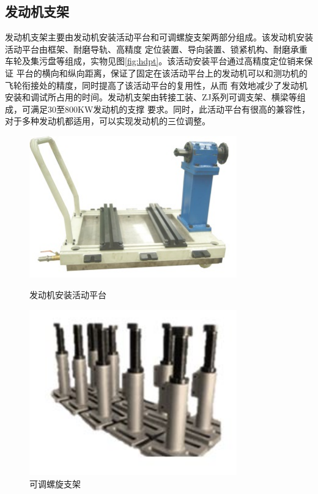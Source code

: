 \subsection{发动机支架}
发动机支架主要由发动机安装活动平台和可调螺旋支架两部分组成。该发动机安装活动平台由框架、耐磨导轨、高精度
定位装置、导向装置、锁紧机构、耐磨承重车轮及集污盘等组成，实物见图\ref{fig:hdpt}。该活动安装平台通过高精度定位销来保证
平台的横向和纵向距离，保证了固定在该活动平台上的发动机可以和测功机的飞轮衔接处的精度，同时提高了该活动平台的复用性，从而
有效地减少了发动机安装和调试所占用的时间。发动机支架由转接工装、ZJ系列可调支架、横梁等组成，可满足30至800KW发动机的支撑
要求。同时，此活动平台有很高的兼容性，对于多种发动机都适用，可以实现发动机的三位调整。
\begin{figure}[!h]
	\begin{minipage}[h]{0.5\linewidth}
		\includegraphics[width=0.8\textwidth]{thesis_figure/platformer_chapter/hdpt}
		\caption{发动机安装活动平台}
		\label{fig:hdpt}
	\end{minipage}%
	\begin{minipage}[h]{0.5\linewidth}
		\includegraphics[width=0.8\textwidth]{thesis_figure/platformer_chapter/lxzj}
		\caption{可调螺旋支架}
		\label{fig:ktzj}
	\end{minipage}
\end{figure}
